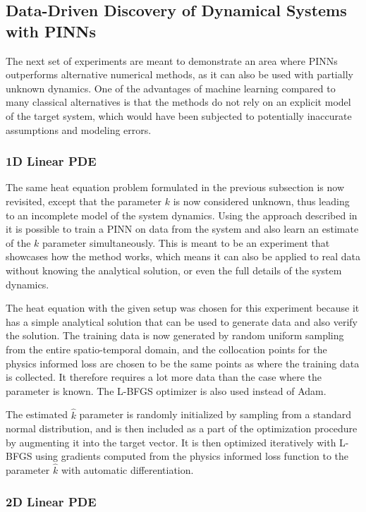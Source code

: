 \subsection{Data-Driven Discovery of Dynamical Systems with PINNs}

The next set of experiments are meant to demonstrate an area where PINNs outperforms alternative numerical methods, as it can also be used with partially unknown dynamics. One of the advantages of machine learning compared to many classical alternatives is that the methods do not rely on an explicit model of the target system, which would have been subjected to potentially inaccurate assumptions and modeling errors. 

\subsubsection{1D Linear PDE}

The same heat equation problem formulated in the previous subsection is now revisited, except that the parameter $k$ is now considered unknown, thus leading to an incomplete model of the system dynamics. Using the approach described in \cite{pinn2} it is possible to train a PINN on data from the system and also learn an estimate of the $k$ parameter simultaneously. This is meant to be an experiment that showcases how the method works, which means it can also be applied to real data without knowing the analytical solution, or even the full details of the system dynamics.

The heat equation with the given setup was chosen for this experiment because it has a simple analytical solution that can be used to generate data and also verify the solution. The training data is now generated by random uniform sampling from the entire spatio-temporal domain, and the collocation points for the physics informed loss are chosen to be the same points as where the training data is collected. It therefore requires a lot more data than the case where the parameter is known. The L-BFGS optimizer is also used instead of Adam.

The estimated $\hat{k}$ parameter is randomly initialized by sampling from a standard normal distribution, and is then included as a part of the optimization procedure by augmenting it into the target vector. It is then optimized iteratively with L-BFGS using gradients computed from the physics informed loss function to the parameter $\hat{k}$ with automatic differentiation.

\subsubsection{2D Linear PDE}

